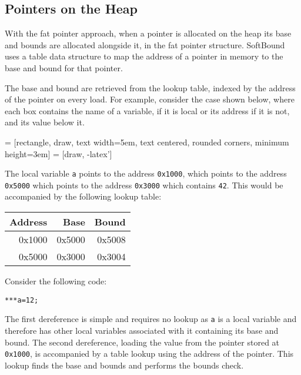 \subsection{Pointers on the Heap}

With the fat pointer approach, when a pointer is allocated on the heap its base and bounds are allocated alongside it, in the fat pointer structure.
SoftBound uses a table data structure to map the address of a pointer in memory to the base and bound for that pointer.

The base and bound are retrieved from the lookup table, indexed by the address of the pointer on every load.
For example, consider the case shown below, where each box contains the name of a variable, if it is local or its address if it is not, and its value below it. 

\noindent
{} = [rectangle, draw, 
    text width=5em, text centered, rounded corners, minimum height=3em]
 = [draw, -latex']

The local variable \verb!a! points to the address \verb!0x1000!, which points to the address \verb!0x5000! which points to the address \verb!0x3000! which contains \verb!42!. This would be accompanied by the following lookup table:

\noindent
\begin{tabular}{|r|r|r|}
\hline Address & Base & Bound \\
\hline 0x1000 & 0x5000 & 0x5008 \\
\hline 0x5000 & 0x3000 & 0x3004 \\
\hline
\end{tabular}

Consider the following code:

\begin{verbatim}
***a=12;
\end{verbatim}

The first dereference is simple and requires no lookup as \verb!a! is a local variable and therefore has other local variables associated with it containing its base and bound.
The second dereference, loading the value from the pointer stored at \verb!0x1000!, is accompanied by a table lookup using the address of the pointer.
This lookup finds the base and bounds and performs the bounds check.

